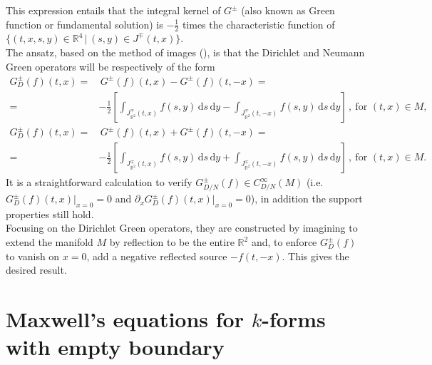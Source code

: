 \begin{Example}
	This expression entails that the integral kernel of $G^\pm$ (also known as Green function or fundamental solution) is $-\frac12$ times the characteristic function of $\{	(t,x,s,y)\in \mathbb{R}^4\,|\, (s,y)\in J^\mp(t,x)	\}$.\\
	The ansatz, based on the method of images (\cite[p. 480]{Jackson-99}), is that the Dirichlet and Neumann Green operators will be respectively of the form
	\begin{align*}
		G^\pm_D(f)(t,x)= &\, G^\pm (f)(t,x)-G^\pm (f)(t,-x)=\\
		=&-\frac12\left[ \int_{J_{\mathbb{R}^2}^\mp(t,x)} f(s,y)\,\mathrm{d}s\,\mathrm{d}y- \int_{J_{\mathbb{R}^2}^\mp(t,-x)} f(s,y)\,\mathrm{d}s\,\mathrm{d}y\right]\,,\ \text{for }(t,x)\in M,\\
		G^\pm_D(f)(t,x)= &\, G^\pm (f)(t,x)+G^\pm (f)(t,-x)=\\
		=&-\frac12\left[ \int_{J_{\mathbb{R}^2}^\mp(t,x)} f(s,y)\,\mathrm{d}s\,\mathrm{d}y+ \int_{J_{\mathbb{R}^2}^\mp(t,-x)} f(s,y)\,\mathrm{d}s\,\mathrm{d}y\right]\,,\ \text{for }(t,x)\in M.
	\end{align*}
	It is a straightforward calculation to verify $G^\pm_{D/N}(f)\in C^\infty_{D/N}(M)$ (i.e. $G^\pm_D(f)(t,x)|_{x=0}=0$ and $\partial_x G^\pm_D(f)(t,x)|_{x=0}=0$), in addition the support properties still hold.\\
	Focusing on the Dirichlet Green operators, they are constructed by imagining to extend the manifold $M$ by reflection to be the entire $\mathbb{R}^2$ and, to enforce $G_D^\pm(f)$ to vanish on $x=0$, add a negative reflected source $-f(t,-x)$. This gives the desired result.
\end{Example}

\section{Maxwell's equations for $k$-forms with empty boundary}\label{Sec: Maxwell introduction}



